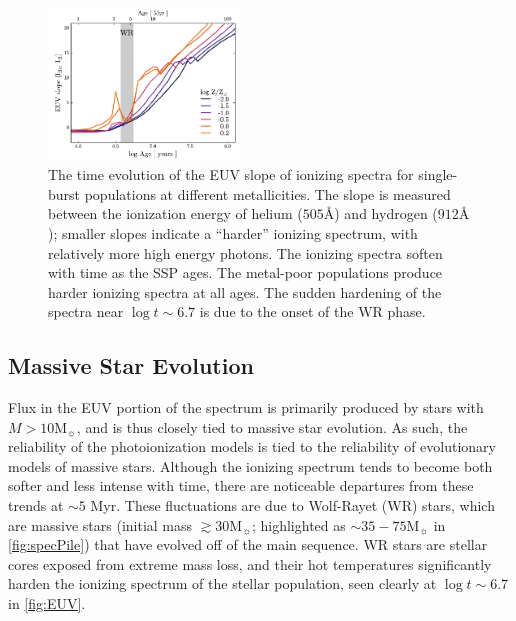\documentclass[twocolumn, tighten]{aastex61}
\newcommand{\Fig}[1]{\autoref{fig:#1}}
\newcommand\Msun{\ensuremath{\mathrm{M_{\sun}}}}
\newcommand{\ang}{\ensuremath{\mbox{\AA}}}
\begin{document}
\begin{figure}
  \begin{centering}
    \includegraphics[width=0.45\textwidth]{f3.pdf}
    \caption{The time evolution of the EUV slope of ionizing spectra for single-burst populations at different metallicities. The slope is measured between the ionization energy of helium ($505\ang$) and hydrogen ($912\ang$); smaller slopes indicate a ``harder'' ionizing spectrum, with relatively more high energy photons. The ionizing spectra soften with time as the SSP ages. The metal-poor populations produce harder ionizing spectra at all ages. The sudden hardening of the spectra near $\log t \sim 6.7$ is due to the onset of the WR phase.}
    \label{fig:EUV}
  \end{centering}
\end{figure}

\subsection{Massive Star Evolution}\label{sec:spectra:stars}

Flux in the EUV portion of the spectrum is primarily produced by stars with $M > 10\Msun$, and is thus closely tied to massive star evolution. As such, the reliability of the photoionization models is tied to the reliability of evolutionary models of massive stars. Although the ionizing spectrum tends to become both softer and less intense with time, there are noticeable departures from these trends at ${\sim}5$ Myr. These fluctuations are due to Wolf-Rayet (WR) stars, which are massive stars (initial mass $\gtrsim 30\Msun$; highlighted as $\sim 35-75 \Msun$ in \Fig{specPile}) that have evolved off of the main sequence. WR stars are stellar cores exposed from extreme mass loss, and their hot temperatures significantly harden the ionizing spectrum of the stellar population, seen clearly at $\log t \sim 6.7$ in \Fig{EUV}.
\end{document}
